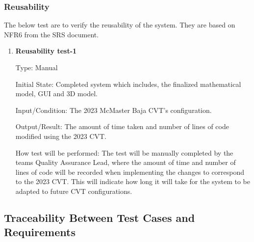 \documentclass[12pt, titlepage]{article}
\begin{document}
\subsubsection{Reusability}

The below test are to verify the reusability of the system.
They are based on NFR6 from the SRS document.

\begin{enumerate}

  \item {} \hypertarget{Reusability test-1}{\textbf{Reusability test-1}} \label{Reusability test-1}
    
Type: Manual
              
Initial State: Completed system which includes, the finalized mathematical model, GUI and 3D model.  
              
Input/Condition: The 2023 McMaster Baja CVT's configuration. 
              
Output/Result: The amount of time taken and number of lines of code modified using the 2023 CVT.
              
How test will be performed: The test will be manually completed by the teams Quality Assurance Lead, where the amount of time and number of lines of code will be recorded when implementing the changes to correspond to the 2023 CVT.
This will indicate how long it will take for the system to be adapted to future CVT configurations. 
    
\end{enumerate}

\subsection{Traceability Between Test Cases and Requirements}
\end{document}
